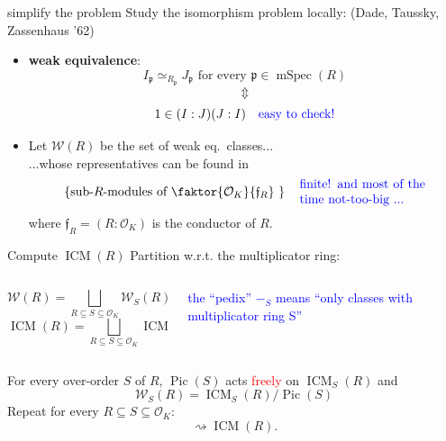 \documentclass[usenames,dvipsnames,handout]{beamer}
\DeclareMathOperator{\ICM}{ICM}
\DeclareMathOperator{\Pic}{Pic}
\DeclareMathOperator{\mSpec}{mSpec}
\newcommand{\cO}{{\mathcal O}}
\newcommand{\cW}{{\mathcal W}}
\newcommand{\p}{{\mathfrak p}}
\newcommand{\frf}{{\mathfrak f}}
\newcommand{\set}[1]{\left\lbrace#1\right\rbrace }
\newcommand{\red}[1]{\textcolor{red}{#1}}
\begin{document}
\begin{frame}{ simplify the problem  }
    Study the isomorphism problem locally: (Dade, Taussky, Zassenhaus '62)
    \begin{itemize}
\pause 
    \item  \textbf{weak equivalence}:
    \[I_{\p}\simeq_{R_{\p}} J_{\p} \text{ for every } {\p} \in \mSpec(R)\]
\pause
    \vspace{-6mm}\[\Updownarrow\]
    \[1\in (I:J)(J:I)\quad \textcolor{blue}{\text{easy to check!}}\]
\pause
    \item Let $\cW(R)$ be the set of weak eq.~classes...\\
\pause
    ...whose representatives can be found in
    \[\set{\text{sub-$R$-modules of $\faktor{\cO_K}{\frf_R}$ }} \quad \textcolor{blue}{\parbox{10 em}{finite! and most of the time not-too-big ...}}\]
    where $\frf_R=(R:\cO_K)$ is the conductor of $R$.
    \end{itemize}
\end{frame}

\begin{frame}{ Compute $\ICM(R)$ }
\pause 
    Partition w.r.t. the multiplicator ring:
    \begin{columns}
    \begin{column}{0.5\textwidth}
      \[ \cW(R) = \bigsqcup_{R\subseteq S \subseteq \cO_K} \cW_S(R)\]
      \[ \ICM(R) = \bigsqcup_{R\subseteq S \subseteq \cO_K} \ICM_S(R)\]
    \end{column}
\pause
    \begin{column}{0.5\textwidth}  %
    \begin{center}
    \textcolor{blue}{\parbox{10em}{the ``pedix'' $-_S$ means ``only classes with multiplicator ring S''}} 
    \end{center}
    \end{column}
    \end{columns}
\pause
    \begin{theorem}[M.]
    For every over-order $S$ of $R$, $\Pic(S)$ acts \red{freely} on $\ICM_S(R)$ and
    \[ \cW_S(R) = \ICM_S(R) / \Pic(S) \]
\pause
    Repeat for every $R\subseteq S \subseteq \cO_K$:
    \[ \rightsquigarrow \ICM(R).\]
    \end{theorem}
\end{frame}
\end{document}
